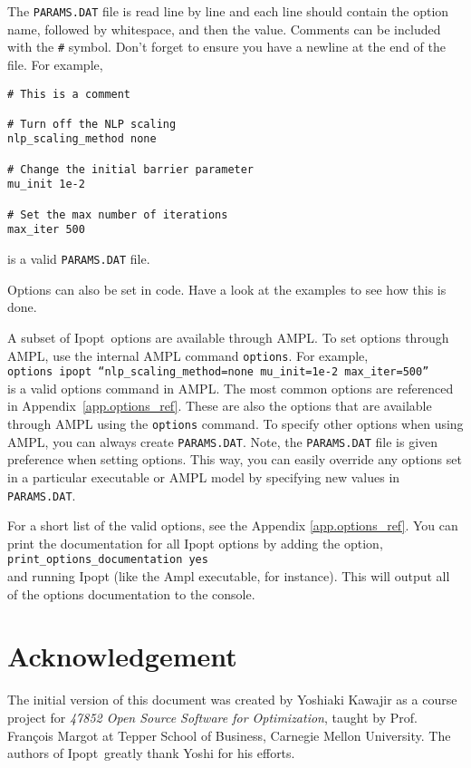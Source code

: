 \documentclass[letter,10pt]{article}
\newcommand{\Ipopt}{{\sc Ipopt}}
\begin{document}
The {\tt PARAMS.DAT} file is read line by line and each line should
contain the option name, followed by whitespace, and then the
value. Comments can be included with the {\tt \#} symbol. Don't forget
to ensure you have a newline at the end of the file. For example,
\begin{verbatim}
# This is a comment

# Turn off the NLP scaling
nlp_scaling_method none

# Change the initial barrier parameter
mu_init 1e-2

# Set the max number of iterations
max_iter 500

\end{verbatim}
is a valid {\tt PARAMS.DAT} file.

Options can also be set in code. Have a look at the examples to see
how this is done. 

A subset of \Ipopt\ options are available through AMPL. To set options
through AMPL, use the internal AMPL command {\tt options}.  For
example, \\ 
{\tt options ipopt ``nlp\_scaling\_method=none mu\_init=1e-2
max\_iter=500''} \\ 
is a valid options command in AMPL. The most common
options are referenced in Appendix~\ref{app.options_ref}. These are also
the options that are available through AMPL using the {\tt options}
command. To specify other options when using AMPL, you can always
create {\tt PARAMS.DAT}.  Note, the {\tt PARAMS.DAT} file is given
preference when setting options. This way, you can easily override any
options set in a particular executable or AMPL model by specifying new
values in {\tt PARAMS.DAT}.

For a short list of the valid options, see the Appendix
\ref{app.options_ref}. You can print the documentation for all Ipopt
options by adding the option, \\ {\tt print\_options\_documentation
yes} \\ and running Ipopt (like the Ampl executable, for
instance). This will output all of the options documentation to the
console.

\section*{Acknowledgement}
The initial version of this document was created by Yoshiaki Kawajir
as a course project for \textit{47852 Open Source Software for
Optimization}, taught by Prof. Fran\c cois Margot at Tepper School of
Business, Carnegie Mellon University. The authors of \Ipopt\ greatly
thank Yoshi for his efforts.
\end{document}
